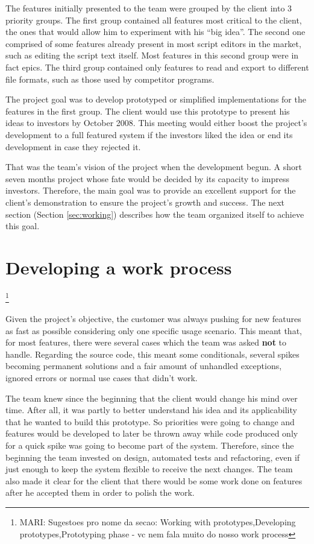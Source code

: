 \documentclass[lnbip]{svmultln}
\newcommand{\mari}[1]{\footnote{MARI: #1}}
\begin{document}
The features initially presented to the team were grouped by the client into 3
priority groups. The first group contained all features most critical to the
client, the ones that would allow him to experiment with his ``big idea''. The
second one comprised of some features already present in most script editors in
the market, such as editing the script text itself. Most features in this second
group were in fact epics. The third group contained only features to read and
export to different file formats, such as those used by competitor programs.

The project goal was to develop prototyped or simplified implementations for the
features in the first group. The client would use this prototype to present his
ideas to investors by October 2008. This meeting would either boost the
project's development to a full featured system if the investors liked the idea
or end its development in case they rejected it.

That was the team's vision of the project when the development
begun. A short seven months project whose fate would be decided by its
capacity to impress investors. Therefore, the main goal was to provide
an excellent support for the client's demonstration to ensure the
project's growth and success. The next section (Section
\ref{sec:working}) describes how the team organized itself to achieve
this goal.

\section{Developing a work process}\mari{Sugestoes pro nome da secao: Working with prototypes,Developing prototypes,Prototyping phase - vc nem fala muito do nosso work process}
\label{sec:working}

Given the project's objective, the customer was always pushing for new features as fast as possible considering only one specific usage scenario. This meant that, for most features, there were several cases which the team was asked \textbf{not} to handle. Regarding the source code, this meant some conditionals, several spikes becoming permanent solutions and a fair amount of unhandled exceptions, ignored errors or normal use cases that didn't work.

The team knew since the beginning that the client would change his mind over time. After all, it was partly to better understand his idea and its applicability that he wanted to build this prototype. So priorities were going to change and features would be developed to later be thrown away while code produced only for a quick spike was going to become part of the system. Therefore, since the beginning the team invested on design, automated tests and refactoring, even if just enough to keep the system flexible to receive the next changes. The team also made it clear for the client that there would be some work done on features after he accepted them in order to polish the work.
\end{document}
